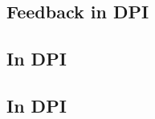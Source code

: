 


\subsection{Feedback in DPI}


\subsection{In DPI}\label{subsec:dpi-intersection}

\subsection{In DPI}\label{subsec:dpi-union}

